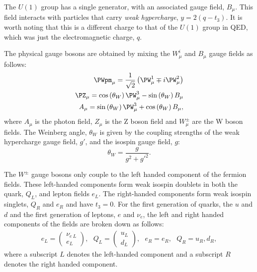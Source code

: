 The $U(1)$ group has a single generator, with an associated gauge
field, $B_{\mu}$. This field interacts with particles that
carry \emph{weak hypercharge}, $y=2(q-t_3)$. It is worth noting that this
is a different charge to that of the $U(1)$ group in \ac{QED}, which was
just the electromagnetic charge, $q$. 

The physical gauge bosons are obtained by mixing the $W_{\mu}^i$ and $B_{\mu}$ gauge
fields as follows:
\begin{equation}
  \begin{split}
  \PWpm_{\mu}=\frac{1}{\sqrt{2}}\left(\PW^{1}_{\mu}\mp i\PW^{2}_{\mu}\right) \\
  \PZ_{\mu}=\cos\left(\theta_{W}\right)\PW^{3}_{\mu}-\sin\left(\theta_{W}\right)B_{\mu} \\
  A_{\mu}=\sin\left(\theta_{W}\right)\PW^{3}_{\mu}+\cos\left(\theta_{W}\right)B_{\mu},
  \end{split}
\end{equation}
where $A_{\mu}$ is the photon field, $Z_{\mu}$ is the Z boson field
and $W^{\pm}_{\mu}$ are the W boson fields. The Weinberg angle,
$\theta_W$ is given by the coupling strengths of the weak hypercharge
gauge field, $g'$, and the isospin gauge field, $g$:
\begin{equation}
\theta_W = \frac{g}{g^2+g'^2}.
\end{equation}

The $W^{\pm}$ gauge bosons only couple to the left handed component of
the fermion fields. These left-handed components form weak isospin
doublets in both the quark, $Q_L$, and lepton fields $e_L$. The
right-handed components form weak isospin singlets, $Q_R$ and $e_R$
and have $t_3=0$. For the first generation of quarks, the $u$ and $d$
and the first generation of leptons, $e$ and $\nu_e$, the left and
right handed components of the fields are broken down as follows:
\begin{equation}
  \begin{split}
  e_L=\left(\begin{array}{c} \nu_{e~L} \\
  e_L\end{array}\right),~~~
  Q_L=\left(\begin{array}{c} u_L \\
  d_L\end{array}\right),~~~e_R=e_R,~~~Q_R=u_R,d_R,
  \end{split}
\end{equation}
where a subscript $L$ denotes the left-handed component and a
subscript $R$ denotes the right handed component.

